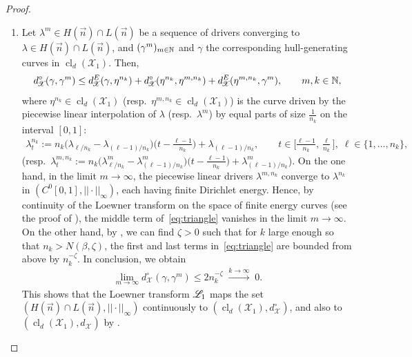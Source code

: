 \documentclass[a4paper, 11pt]{article}
\theoremstyle{definition}
\numberwithin{equation}{section}
\numberwithin{figure}{section}
\newcommand{\cLoewnerTransform}[1][]{\mathscr{L}_{\ifx&#1&\else#1\fi}}
\newcommand{\funs}[2][]{C^{0}_{#1}[0,#2}
\newcommand{\Hpaths}[1][]{\mathscr{X}_{#1}} %
\newcommand{\Hpathscl}[1][]{\operatorname{cl}_{d}(\Hpaths[#1])}
\newcommand{\norm}[1]{|\!|#1|\!|}
\newcommand{\normUniform}[1]{\norm{#1}_\infty}
\newcommand{\dHpaths}[1][]{d_{\!\Hpaths[#1]}}
\newcommand{\dHpathsEucl}{d_{\!\Hpaths[]}^E}
\newcommand{\dHpathsUnparam}{d_{\!\Hpaths}^\circ}%
\begin{document}
\begin{proof}
\begin{enumerate}[leftmargin=*, label=\textnormal{(\roman*)}]
\item 
Let $\lambda^m \in H(\vec n) \cap L(\vec n)$ be a sequence of drivers converging to $\lambda \in H(\vec n) \cap L(\vec n)$,
and $(\gamma^m)_{m \in \mathbb{N}}$ and $\gamma$ the corresponding hull-generating curves in $\Hpathscl[1]$. 
Then, 
\begin{align} \label{eq:triangle}
\dHpathsUnparam(\gamma, \gamma^m) \le \dHpathsEucl(\gamma, \eta^{n_k}) + \dHpathsUnparam(\eta^{n_k},\eta^{m,n_k}) + \dHpathsEucl(\eta^{m,n_k},\gamma^m) , \qquad m,k \in \bN ,
\end{align}
where $\eta^{n_k} \in \Hpathscl[1]$ (resp.~$\eta^{m,n_k} \in \Hpathscl[1]$) is the curve driven by the piecewise linear interpolation of 
$\lambda$ (resp.~$\lambda^m$) by equal parts of size $\tfrac{1}{n_k}$ on the interval $[0,1]$: 
\begin{align*}
\lambda_t^{n_k}
:= n_k \big( \lambda_{\ell/n_k}  - \lambda_{(\ell-1)/n_k} \big)
\big( t - \tfrac{\ell-1}{n_k} \big) + \lambda_{(\ell-1)/n_k} , 
\qquad t \in \big[ \tfrac{\ell-1}{n_k}, \tfrac{\ell}{n_k} \big] , \; \ell \in \{1,\ldots,n_k\} ,
\end{align*}
(resp.~$\lambda^{m,n_k}_t := n_k \big( \lambda^m_{\ell/n_k}  - \lambda^m_{(\ell-1)/n_k} \big)
\big( t - \tfrac{\ell-1}{n_k} \big) + \lambda^m_{(\ell-1)/n_k}$). 
On the one hand, in the limit $m \to \infty$, 
the piecewise linear drivers $\lambda^{m,n_k}$ converge to $\lambda^{n_k}$ in $(\funs{1]},\normUniform{\cdot})$, each having finite Dirichlet energy. Hence, by continuity of the Loewner transform on the space of finite energy curves (see the proof of \cite[Lemma 2.7]{Peltola-Wang:LDP}), the middle term of~\eqref{eq:triangle} vanishes in the limit $m \to \infty$. 
On the other hand, by , 
we can find $\zeta > 0$ such that for $k$ large enough so that $n_k > N(\beta,\zeta)$, 
the first and last terms in~\eqref{eq:triangle} are bounded from above by $n_k^{-\zeta}$. 
In conclusion, we obtain
\begin{align*}
\lim_{m \to \infty} \dHpathsUnparam(\gamma, \gamma^m) \le 2n_k^{-\zeta} 
\; \xrightarrow{k \to \infty} \; 0 .
\end{align*}
This shows that the Loewner transform $\cLoewnerTransform[1]$ maps the set
$(H(\vec n) \cap L(\vec n),\normUniform{\cdot})$ continuously to $(\Hpathscl[1],\dHpathsUnparam)$, 
and also to $(\Hpathscl[1],\dHpaths)$ by .
\end{enumerate}


\end{proof}
\end{document}
